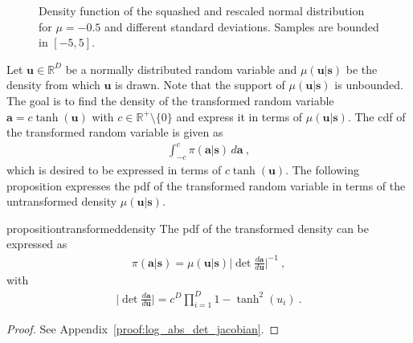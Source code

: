 \begin{figure}[h]
	\centering
	\captionsetup{justification=centering}
	\scalebox{0.9}{
    
    }
	\caption[Squashed normal density]{Density function of the squashed and rescaled normal distribution for $\mu=-0.5$ and different standard deviations. Samples are bounded in $[-5, 5]$.}
\label{fig:squashed_density}
\end{figure}

Let $\mathbf u \in \mathbb R^D$ be a normally distributed random variable and $\mu (\mathbf u | \mathbf s)$ be the density from which $\mathbf u$ is drawn. Note that the support of $\mu (\mathbf u | \mathbf s)$ is unbounded. The goal is to find the density of the transformed random variable $\mathbf a = c \tanh (\mathbf u)$ with $c \in \mathbb R^+ \setminus \{0\}$ and express it in terms of $\mu (\mathbf u | \mathbf s)$.
The \gls{cdf} of the transformed random variable is given as
\begin{gather}\label{eq:target_density}
    \int_{-c}^c \pi (\mathbf a | \mathbf s) \, d \mathbf a~,
\end{gather}
which is desired to be expressed in terms of $c \tanh (\mathbf u)$. The following proposition expresses the \gls{pdf} of the transformed random variable in terms of the untransformed density $\mu (\mathbf u | \mathbf s)$.
\begin{restatable}{proposition}{transformeddensity}
\label{theorem:log_bas_det_jacobian}
The \gls{pdf} of the transformed density can be expressed as 
\begin{gather}\label{eq:transformed_density}
    \pi (\mathbf a | \mathbf s) = \mu ( \mathbf u | \mathbf s) \bigg| \det \frac{d \mathbf a}{d \mathbf u} \bigg|^{-1}~,
\end{gather}
with 
\begin{gather}\label{eq:log_det}
     \bigg| \det \frac{d \mathbf a}{d \mathbf u} \bigg| = c^D \prod_{i=1}^D 1 -  \tanh^2(u_i)~.
\end{gather}
\end{restatable}
\begin{proof}
See Appendix~\ref{proof:log_abs_det_jacobian}.
\end{proof}


